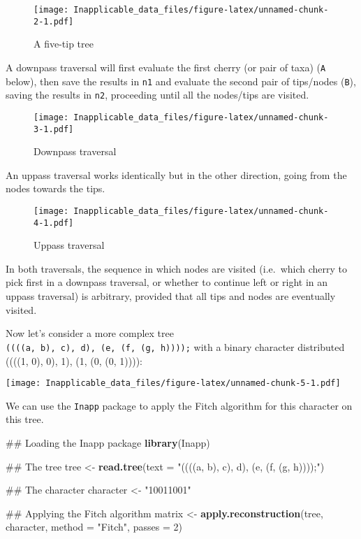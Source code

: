 \documentclass[]{book}
\newenvironment{Shaded}{\begin{snugshade}}{\end{snugshade}}
\newcommand{\KeywordTok}[1]{\textcolor[rgb]{0.13,0.29,0.53}{\textbf{#1}}}
\newcommand{\DataTypeTok}[1]{\textcolor[rgb]{0.13,0.29,0.53}{#1}}
\newcommand{\DecValTok}[1]{\textcolor[rgb]{0.00,0.00,0.81}{#1}}
\newcommand{\StringTok}[1]{\textcolor[rgb]{0.31,0.60,0.02}{#1}}
\newcommand{\NormalTok}[1]{#1}
\theoremstyle{definition}
\theoremstyle{definition}
\theoremstyle{definition}
\theoremstyle{remark}
\begin{document}
\begin{figure}
\centering
\texttt{[image: Inapplicable\_data\_files/figure-latex/unnamed-chunk-2-1.pdf]}
\caption{\label{fig:unnamed-chunk-2}A five-tip tree}
\end{figure}

A downpass traversal will first evaluate the first cherry (or pair of
taxa) (\texttt{A} below), then save the results in \texttt{n1} and
evaluate the second pair of tips/nodes (\texttt{B}), saving the results
in \texttt{n2}, proceeding until all the nodes/tips are visited.

\begin{figure}
\centering
\texttt{[image: Inapplicable\_data\_files/figure-latex/unnamed-chunk-3-1.pdf]}
\caption{\label{fig:unnamed-chunk-3}Downpass traversal}
\end{figure}

An uppass traversal works identically but in the other direction, going
from the nodes towards the tips.

\begin{figure}
\centering
\texttt{[image: Inapplicable\_data\_files/figure-latex/unnamed-chunk-4-1.pdf]}
\caption{\label{fig:unnamed-chunk-4}Uppass traversal}
\end{figure}

In both traversals, the sequence in which nodes are visited (i.e.~which
cherry to pick first in a downpass traversal, or whether to continue
left or right in an uppass traversal) is arbitrary, provided that all
tips and nodes are eventually visited.

Now let's consider a more complex tree
\texttt{((((a,\ b),\ c),\ d),\ (e,\ (f,\ (g,\ h))));} with a binary
character distributed ((((1, 0), 0), 1), (1, (0, (0, 1)))):

\texttt{[image: Inapplicable\_data\_files/figure-latex/unnamed-chunk-5-1.pdf]}

We can use the \texttt{Inapp} package to apply the Fitch algorithm for
this character on this tree.

\begin{Shaded}
\begin{Highlighting}[]
\NormalTok{## Loading the Inapp package}
\KeywordTok{library}\NormalTok{(Inapp)}

\NormalTok{## The tree}
\NormalTok{tree <-}\StringTok{ }\KeywordTok{read.tree}\NormalTok{(}\DataTypeTok{text =} \StringTok{"((((a, b), c), d), (e, (f, (g, h))));"}\NormalTok{)}

\NormalTok{## The character}
\NormalTok{character <-}\StringTok{ "10011001"}

\NormalTok{## Applying the Fitch algorithm}
\NormalTok{matrix <-}\StringTok{ }\KeywordTok{apply.reconstruction}\NormalTok{(tree, character, }\DataTypeTok{method =} \StringTok{"Fitch"}\NormalTok{, }\DataTypeTok{passes =} \DecValTok{2}\NormalTok{)}
\end{Highlighting}
\end{Shaded}
\end{document}
